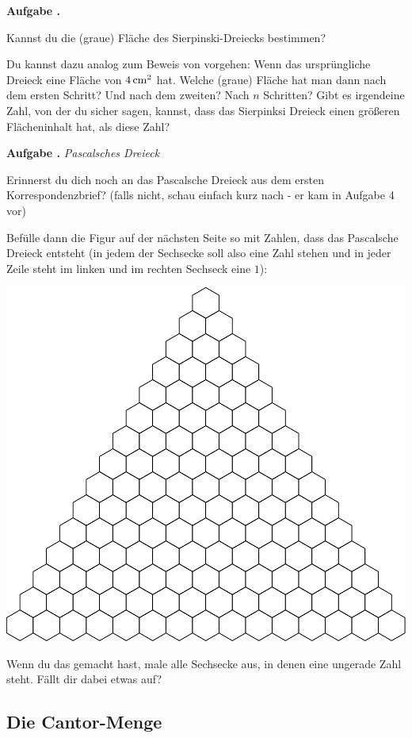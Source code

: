 \documentclass[a4paper,ngerman,12pt]{scrartcl}
\theoremstyle{definition}
\theoremstyle{plain}
\theoremstyle{remark}
\newlength{\aufgabenskip}
\newcounter{aufgabennummer}
\newenvironment{aufgabe}[1]{
  \addtocounter{aufgabennummer}{1}
  \textbf{Aufgabe \theaufgabennummer.} \emph{#1} \par
}{\vspace{\aufgabenskip}}
\begin{document}
\begin{aufgabe}{}
	Kannst du die (graue) Fläche des Sierpinski-Dreiecks bestimmen? 
	
	Du kannst dazu analog zum Beweis von  vorgehen: Wenn das ursprüngliche Dreieck eine Fläche von $\unit[4]{cm^2}$ hat. Welche (graue) Fläche hat man dann nach dem ersten Schritt? Und nach dem zweiten? Nach $n$ Schritten? Gibt es irgendeine Zahl, von der du sicher sagen, kannst, dass das Sierpinksi Dreieck einen größeren Flächeninhalt hat, als diese Zahl?
\end{aufgabe}

\begin{aufgabe}{Pascalsches Dreieck}
	Erinnerst du dich noch an das Pascalsche Dreieck aus dem ersten Korrespondenzbrief? (falls nicht, schau einfach kurz nach - er kam in Aufgabe 4 vor)
	
	Befülle dann die Figur auf der nächsten Seite so mit Zahlen, dass das Pascalsche Dreieck entsteht (in jedem der Sechsecke soll also eine Zahl stehen und in jeder Zeile steht im linken und im rechten Sechseck eine $1$):
	
	\begin{center}
		\includegraphics[width=.9\textwidth]{Bilder/Pascalsches-Dreieck.pdf}
	\end{center}

	Wenn du das gemacht hast, male alle Sechsecke aus, in denen eine ungerade Zahl steht. Fällt dir dabei etwas auf?
\end{aufgabe}


\subsection{Die Cantor-Menge}\label{aufgabe:Cantor-Menge}
\end{document}
